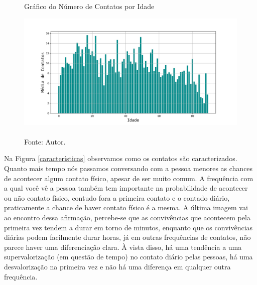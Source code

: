 \begin{figure}[H]
  \centering
  \captionsetup{font=normalsize,skip=1pt,singlelinecheck=on,labelsep=endash}

  \caption{Gráfico do Número de Contatos por Idade}

  \includegraphics[scale=0.5]{./img/idade_contatos.jpg}
  \captionsetup{font=small,position=below,skip=-1pt}
   \caption*{\\Fonte: Autor.}
   \label{M_Idade}
\end{figure}

Na Figura \ref{características} observamos como os contatos são caracterizados. Quanto mais tempo nós passamos conversando com a pessoa menores as chances de acontecer algum contato físico, apesar de ser muito comum. A frequência com a qual você vê a pessoa também tem importante na probabilidade de acontecer ou não contato físico, contudo fora a primeira contato e o contado diário, praticamente a chance de haver contato físico é a mesma. A última imagem vai ao encontro dessa afirmação, percebe-se que as convivências que acontecem pela primeira vez tendem a durar em torno de minutos, enquanto que os convivências diárias podem facilmente durar horas, já em outras frequências de contatos, não parece haver uma diferenciação clara. À vista disso, há uma tendência a uma supervalorização (em questão de tempo) no contato diário pelas pessoas, há uma desvalorização na primeira vez e não há uma diferença em qualquer outra frequência.

